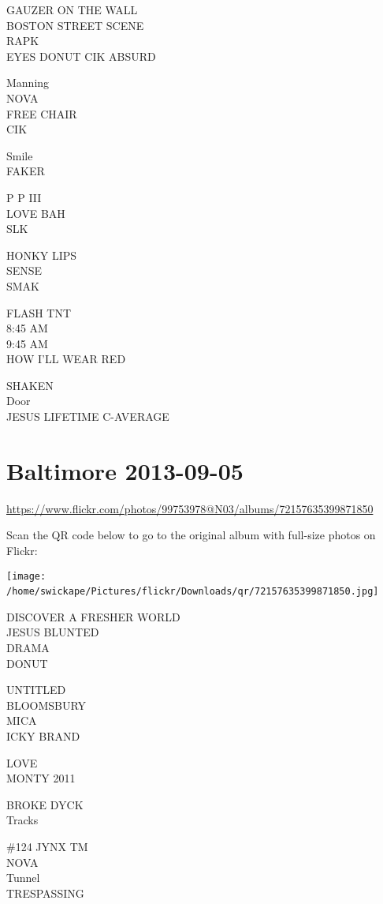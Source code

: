 \documentclass[10pt,letterpaper]{article}
\begin{document}
GAUZER ON THE WALL\\
BOSTON STREET SCENE\\
RAPK\\
EYES DONUT CIK ABSURD

Manning\\
NOVA\\
FREE CHAIR\\
CIK

Smile\\
FAKER

P P III\\
LOVE BAH\\
SLK

HONKY LIPS\\
SENSE\\
SMAK

FLASH TNT\\
8:45 AM\\
9:45 AM\\
HOW I'LL WEAR RED

SHAKEN\\
Door\\
JESUS LIFETIME C{-}AVERAGE
\

\section*{Baltimore 2013-09-05}

\url{https://www.flickr.com/photos/99753978@N03/albums/72157635399871850}

Scan the QR code below to go to the original album with full-size photos on Flickr:

\texttt{[image: /home/swickape/Pictures/flickr/Downloads/qr/72157635399871850.jpg]}
\

DISCOVER A FRESHER WORLD\\
JESUS BLUNTED\\
DRAMA\\
DONUT

UNTITLED\\
BLOOMSBURY\\
MICA\\
ICKY BRAND

LOVE\\
MONTY 2011

BROKE DYCK\\
Tracks

\#124 JYNX TM\\
NOVA\\
Tunnel\\
TRESPASSING
\end{document}
